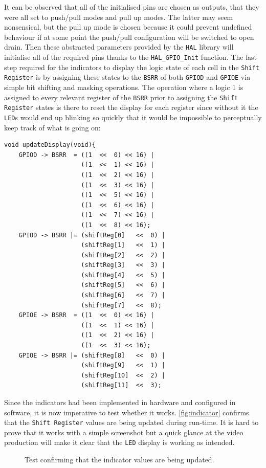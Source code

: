 \documentclass[12pt]{article}
\begin{document}
It can be observed that all of the initialised pins are chosen as outputs, that they were all set to push/pull modes and pull up modes. The latter may seem nonsensical, but the pull up mode is chosen because it could prevent undefined behaviour if at some point the push/pull configuration will be switched to open drain. Then these abstracted parameters provided by the \texttt{HAL} library will initialise all of the required pins thanks to the \texttt{HAL\_GPIO\_Init} function. The last step required for the indicators to display the logic state of each cell in the \texttt{Shift Register} is by assigning these states to the \texttt{BSRR} of both \texttt{GPIOD} and \texttt{GPIOE} via simple bit shifting and masking operations. The operation where a logic 1 is assigned to every relevant register of the \texttt{BSRR} prior to assigning the \texttt{Shift Register} states is there to reset the display for each register since without it the \texttt{LED}s would end up blinking so quickly that it would be impossible to perceptually keep track of what is going on:   
\begin{verbatim}
void updateDisplay(void){
    GPIOD -> BSRR  = ((1  <<  0) << 16) |
                     ((1  <<  1) << 16) |
                     ((1  <<  2) << 16) |
                     ((1  <<  3) << 16) |
                     ((1  <<  5) << 16) |
                     ((1  <<  6) << 16) |
                     ((1  <<  7) << 16) |
                     ((1  <<  8) << 16);
    GPIOD -> BSRR |= (shiftReg[0]   <<  0) |
                     (shiftReg[1]   <<  1) |
                     (shiftReg[2]   <<  2) |
                     (shiftReg[3]   <<  3) |
                     (shiftReg[4]   <<  5) |
                     (shiftReg[5]   <<  6) |
                     (shiftReg[6]   <<  7) |
                     (shiftReg[7]   <<  8);
    GPIOE -> BSRR  = ((1  <<  0) << 16) |
                     ((1  <<  1) << 16) |
                     ((1  <<  2) << 16) |
                     ((1  <<  3) << 16);			 
    GPIOE -> BSRR |= (shiftReg[8]   <<  0) |
                     (shiftReg[9]   <<  1) |
                     (shiftReg[10]  <<  2) |
                     (shiftReg[11]  <<  3);
\end{verbatim}
Since the indicators had been implemented in hardware and configured in software, it is now imperative to test whether it works. \autoref{fig:indicator} confirms that the \texttt{Shift Register} values are being updated during run-time. It is hard to prove that it works with a simple screenshot but a quick glance at the video production will make it clear that the \texttt{LED} display is working as intended.
\begin{figure}[ht]
    \centering
    \caption{Test confirming that the indicator values are being updated.}
    \label{fig:indicator}
\end{figure}
\end{document}

